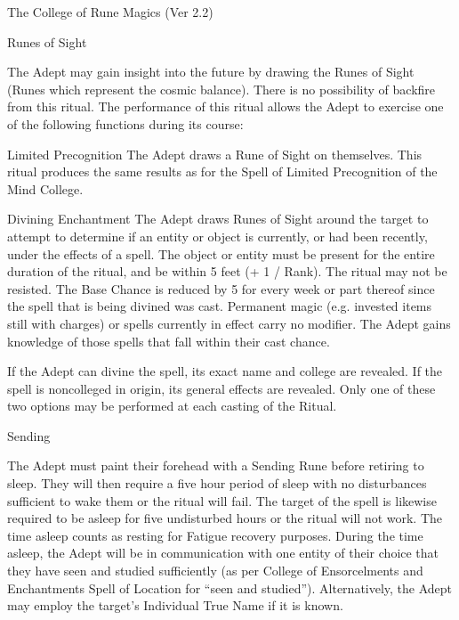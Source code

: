 \begin{Chapter}{The College of Rune Magics (Ver 2.2)}
\begin{ritual}[Q-2]{Runes of Sight}

\begin{effects}
The Adept may gain insight into the future by drawing the Runes of
Sight (Runes which represent the cosmic balance). There is no
possibility of backfire from this ritual.  The performance of this
ritual allows the Adept to exercise one of the following functions
during its course:
\begin{Description}
\item[Limited Precognition] The Adept draws a Rune of Sight on
  themselves. This ritual produces the same results as for the Spell
  of Limited Precognition of the Mind College.

\item[Divining Enchantment] The Adept draws Runes of Sight around the
  target to attempt to determine if an entity or object is currently,
  or had been recently, under the effects of a spell.  The object or
  entity must be present for the entire duration of the ritual, and be
  within 5 feet (+ 1 / Rank). The ritual may not be resisted.  The
  Base Chance is reduced by 5 for every week or part thereof since the
  spell that is being divined was cast.  Permanent magic (e.g.
  invested items still with charges) or spells currently in effect
  carry no modifier.  The Adept gains knowledge of those spells that
  fall within their cast chance.

  If the Adept can divine the spell, its exact name and college are
  revealed.  If the spell is noncolleged in origin, its general
  effects are revealed.  Only one of these two options may be
  performed at each casting of the Ritual.
\end{Description}
\end{effects}
\end{ritual}

\begin{ritual}[Q-3]{Sending}

\begin{effects}
The Adept must paint their forehead with a Sending Rune before
retiring to sleep.  They will then require a five hour period of sleep
with no disturbances sufficient to wake them or the ritual will
fail. The target of the spell is likewise required to be asleep for
five undisturbed hours or the ritual will not work. The time asleep
counts as resting for Fatigue recovery purposes. During the time
asleep, the Adept will be in communication with one entity of their
choice that they have seen and studied sufficiently (as per College of
Ensorcelments and Enchantments Spell of Location for “seen and
studied”). Alternatively, the Adept may employ the target’s Individual
True Name if it is known.


\end{effects}
\end{ritual}
\end{Chapter}
